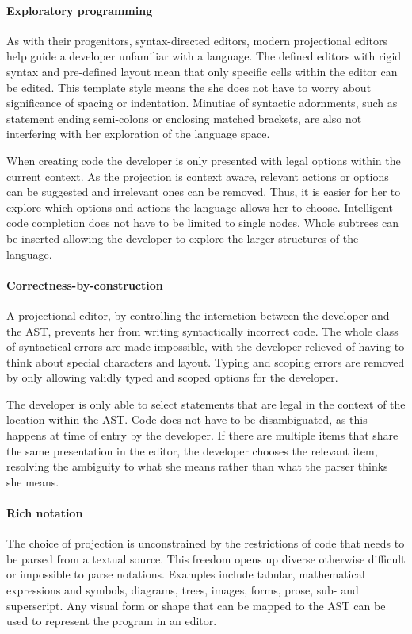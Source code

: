  
\paragraph{Exploratory programming}
As with their progenitors, syntax-directed editors, modern projectional editors help guide a developer unfamiliar with a language.
The defined editors with rigid syntax and pre-defined layout mean that only specific cells within the editor can be edited.
This template style means the she does not have to worry about significance of spacing or indentation.
Minutiae of syntactic adornments, such as statement ending semi-colons or enclosing matched brackets, are also not interfering with her exploration of the language space.

When creating code the developer is only presented with legal options within the current context.
As the projection is context aware, relevant actions or options can be suggested and irrelevant ones can be removed.
Thus, it is easier for her to explore which options and actions the language allows her to choose.
Intelligent code completion does not have to be limited to single nodes.
Whole subtrees can be inserted allowing the developer to explore the larger structures of the language.

\paragraph{Correctness-by-construction}
A projectional editor, by controlling the interaction between the developer and the AST, prevents her from writing syntactically incorrect code.
The whole class of syntactical errors are made impossible, with the developer relieved of having to think about special characters and layout.
Typing and scoping errors are removed by only allowing validly typed and scoped options for the developer.

The developer is only able to select statements that are legal in the context of the location within the AST.
Code does not have to be disambiguated, as this happens at time of entry by the developer.
If there are multiple items that share the same presentation in the editor, the developer chooses the relevant item, resolving the ambiguity to what she means rather than what the parser thinks she means.

\paragraph{Rich notation}
The choice of projection is unconstrained by the restrictions of code that needs to be parsed from a textual source.
This freedom opens up diverse otherwise difficult or impossible to parse notations.
Examples include tabular, mathematical expressions and symbols, diagrams, trees, images, forms, prose, sub- and superscript.
Any visual form or shape that can be mapped to the AST can be used to represent the program in an editor.

